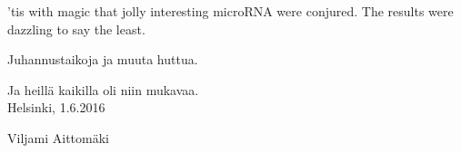 \documentclass[english,12pt,a4paper,pdftex,elec,utf8]{aaltothesis}
\begin{document}
\begin{abstractpage}[english]
  'tis with magic that jolly interesting microRNA were conjured.
  The results were dazzling to say the least.
\end{abstractpage}

\newpage

\begin{abstractpage}[finnish]
  Juhannustaikoja ja muuta huttua.
\end{abstractpage}




















\newpage

Ja heillä kaikilla oli niin mukavaa.\\

\vspace{5cm}
Helsinki, 1.6.2016

\vspace{5mm}
{\hfill Viljami Aittom\"aki \hspace{1cm}}










\newpage


\thesistableofcontents
\end{document}

